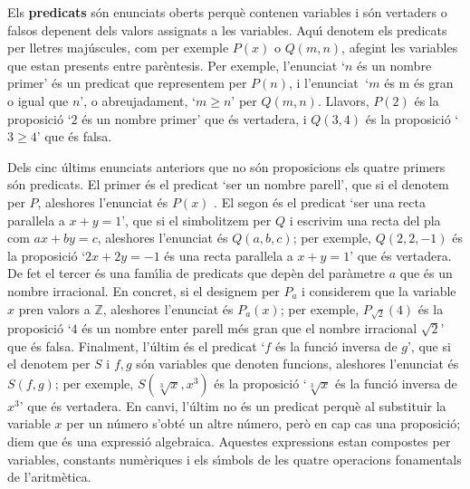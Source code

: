 Els \textbf{predicats} s\'{o}n enunciats oberts perqu\`{e} contenen
variables i s\'{o}n vertaders o falsos depenent dels valors assignats a les
variables. Aqu\'{\i} denotem els predicats per lletres maj\'{u}scules, com
per exemple $P(x)$ o $Q(m,n)$, afegint les variables que estan presents
entre par\`{e}ntesis. Per exemple, l'enunciat `$n$ \'{e}s un nombre primer'
\'{e}s un predicat que representem per $P(n)$, i l'enunciat $\ $`$m$ \'{e}s m%
\'{e}s gran o igual que $n$', o abreujadament, `$m\geq n$' per $Q(m,n)$.
Llavors, $P(2)$ \'{e}s la proposici\'{o} `$2$ \'{e}s un nombre primer' que
\'{e}s vertadera, i $Q(3,4)$ \'{e}s la proposici\'{o} `$3\geq4$' que \'{e}s
falsa.

Dels cinc \'{u}ltims enunciats anteriors que no s\'{o}n proposicions els
quatre primers s\'{o}n predicats. El primer \'{e}s el predicat `ser un
nombre parell', que si el denotem per $P$, aleshores l'enunciat \'{e}s $P(x)$%
. El segon \'{e}s el predicat `ser una recta paral\textperiodcentered lela a
$x+y=1$', que si el simbolitzem per $Q$ i escrivim una recta del pla com $%
ax+by=c$, aleshores l'enunciat \'{e}s $Q(a,b,c)$; per exemple, $Q(2,2,-1)$
\'{e}s la proposici\'{o} `$2x+2y=-1$ \'{e}s una recta
paral\textperiodcentered lela a $x+y=1$' que \'{e}s vertadera. De fet el
tercer \'{e}s una fam\'{\i}lia de predicats que dep\`{e}n del par\`{a}metre $%
a$ que \'{e}s un nombre irracional. En concret, si el designem per $P_{a}$ i
considerem que la variable $x$ pren valors a $\mathbb{Z}$, aleshores
l'enunciat \'{e}s $P_{a}(x)$; per exemple, $P_{\sqrt{2}}(4)$ \'{e}s la
proposici\'{o} `$4$ \'{e}s un nombre enter parell m\'{e}s gran que el nombre
irracional $\sqrt{2}$' que \'{e}s falsa. Finalment, l'\'{u}ltim \'{e}s el
predicat `$f$ \'{e}s la funci\'{o} inversa de $g$', que si el denotem per $S$
i $f,g$ s\'{o}n variables que denoten funcions, aleshores l'enunciat \'{e}s $%
S(f,g)$; per exemple, $S(\sqrt[3]{x},x^{3})$ \'{e}s la proposici\'{o} `$\sqrt%
[3]{x}$ \'{e}s la funci\'{o} inversa de $x^{3}$' que \'{e}s vertadera. En
canvi, l'\'{u}ltim no \'{e}s un predicat perqu\`{e} al substituir la
variable $x$ per un n\'{u}mero s'obt\'{e} un altre n\'{u}mero, per\`{o} en
cap cas una proposici\'{o}; diem que \'{e}s una expressi\'{o} algebraica.
Aquestes expressions estan compostes per variables, constants num\`{e}riques
i els s\'{\i}mbols de les quatre operacions fonamentals de l'aritm\`{e}tica.

